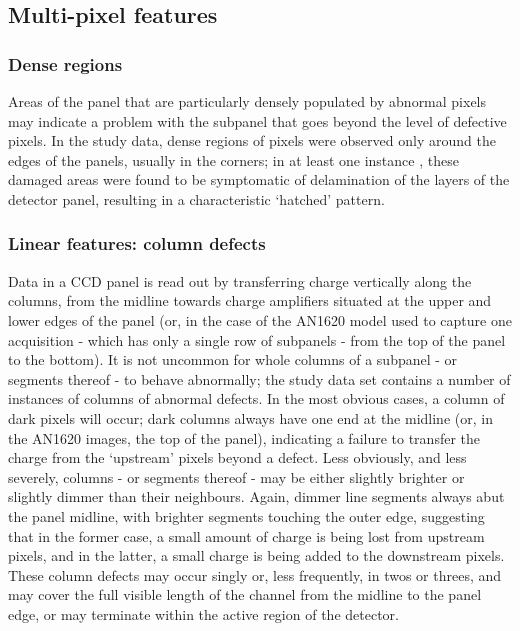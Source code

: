 \documentclass[\main/IO-Pixels.tex]{subfiles}
\begin{document}

\subsection{Multi-pixel features}

\subsubsection{Dense regions}

Areas of the panel that are particularly densely populated by abnormal pixels may indicate a problem with the subpanel that goes beyond the level of defective pixels. In the study data, dense regions of pixels were observed only around the edges of the panels, usually in the corners; in at least one instance , these damaged areas were found to be symptomatic of delamination of the layers of the detector panel, resulting in a characteristic `hatched' pattern. 


\subsubsection{Linear features: column defects}

Data in a CCD panel is read out by transferring charge vertically along the columns, from the midline towards charge amplifiers situated at the upper and lower edges of the panel (or, in the case of the AN1620 model used to capture one acquisition - which has only a single row of subpanels - from the top of the panel to the bottom). It is not uncommon for whole columns of a subpanel - or segments thereof - to behave abnormally; the study data set contains a number of instances of columns of abnormal defects. In the most obvious cases, a column of dark pixels will occur; dark columns always have one end at the midline (or, in the AN1620 images, the top of the panel), indicating a failure to transfer the charge from the `upstream' pixels beyond a defect. Less obviously, and less severely, columns - or segments thereof - may be either slightly brighter or slightly dimmer than their neighbours. Again, dimmer line segments always abut the panel midline, with brighter segments touching the outer edge, suggesting that in the former case, a small amount of charge is being lost from upstream pixels, and in the latter, a small charge is being added to the downstream pixels. These column defects may occur singly or, less frequently, in twos or threes, and may cover the full visible length of the channel from the midline to the panel edge, or may terminate within the active region of the detector. 
\end{document}
